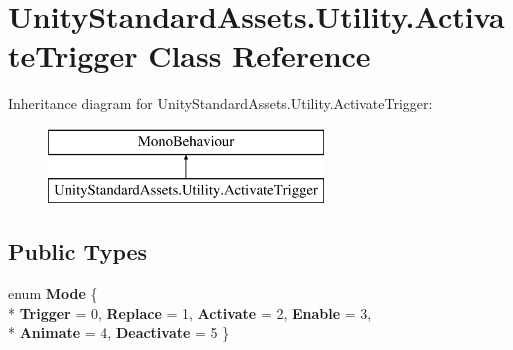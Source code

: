 \hypertarget{class_unity_standard_assets_1_1_utility_1_1_activate_trigger}{}\section{Unity\+Standard\+Assets.\+Utility.\+Activate\+Trigger Class Reference}
\label{class_unity_standard_assets_1_1_utility_1_1_activate_trigger}
Inheritance diagram for Unity\+Standard\+Assets.\+Utility.\+Activate\+Trigger\+:\begin{figure}[H]
\begin{center}
\leavevmode
\includegraphics[height=2.000000cm]{class_unity_standard_assets_1_1_utility_1_1_activate_trigger}
\end{center}
\end{figure}
\subsection*{Public Types}
\begin{DoxyCompactItemize}
\item 
enum {\bfseries Mode} \{ \\*
{\bfseries Trigger} = 0, 
{\bfseries Replace} = 1, 
{\bfseries Activate} = 2, 
{\bfseries Enable} = 3, 
\\*
{\bfseries Animate} = 4, 
{\bfseries Deactivate} = 5
 \}\hypertarget{class_unity_standard_assets_1_1_utility_1_1_activate_trigger_a4e33cb00af0eb967c03fbe756f487b00}{}\label{class_unity_standard_assets_1_1_utility_1_1_activate_trigger_a4e33cb00af0eb967c03fbe756f487b00}

\end{DoxyCompactItemize}

